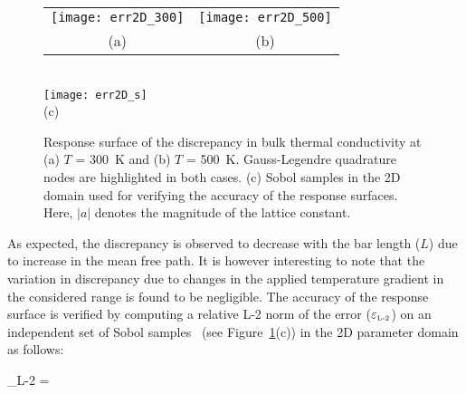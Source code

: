 \begin{figure}[htbp]
\begin{center}
\begin{tabular}{cc}
 \hspace{-10mm}
  \texttt{[image: err2D\_300]}
  &
  \texttt{[image: err2D\_500]}
  \\ (a) & (b)
  \end{tabular}
  \\ \vspace{1mm}
  \texttt{[image: err2D\_s]}
  \\ (c)
\caption{Response surface of the discrepancy in bulk thermal conductivity at (a) $T$ = 300~K and
 (b) $T$ = 500~K. Gauss-Legendre quadrature nodes are highlighted in both cases. (c) Sobol samples
 in the 2D domain used for verifying the accuracy of the response surfaces. Here, $|a|$ denotes the magnitude
 of the lattice constant.}
\label{fig:rs2}
\end{center}
\end{figure}

As expected, the discrepancy is observed to decrease
 with the bar length ($L$) due to increase in the mean free path. It is however interesting to note that the 
 variation in discrepancy due to changes in the applied temperature gradient in the considered range is found to be
 negligible. The accuracy of the response surface is verified by computing a relative L-2 norm of the error
 ($\varepsilon_{\tiny{\mbox{L-2}}}$) on an independent set of Sobol samples~\cite{Saltelli:2010}
(see Figure~\ref{fig:rs2}(c)) in the 2D 
 parameter domain as follows:
 
 \be
 \varepsilon_{\tiny{\mbox{L-2}}} =  
 \label{eq:err_l2}
 \ee
 
